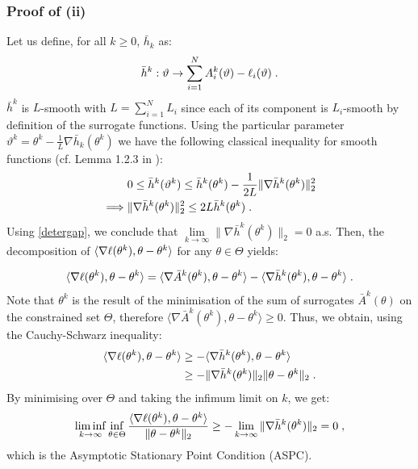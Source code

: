 \subsubsection{Proof of (ii)}
Let us define, for all $k \geq 0$, $\bar{h}_k$ as:
\begin{equation}\label{smoothH}
\bar{h}^k : \vartheta \to \sum_{i=1}^N{A^k_{i}(\vartheta) - \ell_i(\vartheta)}\;.
\end{equation}
$\bar{h}^k$ is $L$-smooth with $L = \sum_{i=1}^N{L_i}$ since each of its component is $L_i$-smooth by definition of the surrogate functions. Using the particular parameter $\vartheta^k = \theta^k - \frac{1}{L}\nabla\bar{h}_k(\theta^k) $ we have the following classical inequality for smooth functions (cf. Lemma 1.2.3 in \citep{nesterov2007Gradient}):
\begin{align}\label{nest}
& 0 \leq \bar{h}^k(\vartheta^k) \leq \bar{h}^k(\theta^k) - \frac{1}{2L}\|\nabla\bar{h}^k(\theta^k)\|_2^2\\
\implies &  \|\nabla\bar{h}^k(\theta^k)\|_2^2 \leq 2L\bar{h}^k(\theta^k)\;.
\end{align}
Using \eqref{detergap}, we conclude that $\lim \limits_{k \to \infty}\|\nabla\bar{h}^k(\theta^k)\|_2 = 0$ a.s. Then, the decomposition of $\langle \nabla \ell(\theta^k),\theta - \theta^k \rangle$ for any $\theta \in \Theta$ yields:

\begin{equation}
\langle \nabla \ell(\theta^k),\theta - \theta^k \rangle = \langle \nabla \bar{A}^k(\theta^k), \theta - \theta^k \rangle - \langle \nabla\bar{h}^k(\theta^k),\theta - \theta^k \rangle\;.
\end{equation}
Note that $\theta^k$ is the result of the minimisation of the sum of surrogates $\bar{A}^k(\theta)$ on the constrained set $\Theta$, therefore  $\langle \nabla \bar{A}^k(\theta^k), \theta - \theta^k \rangle \geq 0$. Thus, we obtain, using the Cauchy-Schwarz inequality:
\begin{align}
\langle \nabla \ell(\theta^k),\theta - \theta^k \rangle & \geq - \langle \nabla\bar{h}^k(\theta^k),\theta - \theta^k \rangle\\
& \geq - \|\nabla\bar{h}^k(\theta^k)\|_2 \|\theta - \theta^k\|_2 \;.
\end{align}
By minimising over $\Theta$ and taking the infimum limit on $k$, we get:
\begin{equation}
\liminf \limits_{k \to \infty}\inf \limits_{\theta \in \Theta} \frac{\langle \nabla \ell(\theta^k),\theta - \theta^k \rangle}{\|\theta - \theta^k\|_2} \geq - \lim \limits_{k \to \infty}\|\nabla\bar{h}^k(\theta^k)\|_2 = 0 \;,
\end{equation}
which is the Asymptotic Stationary Point Condition  (ASPC).
